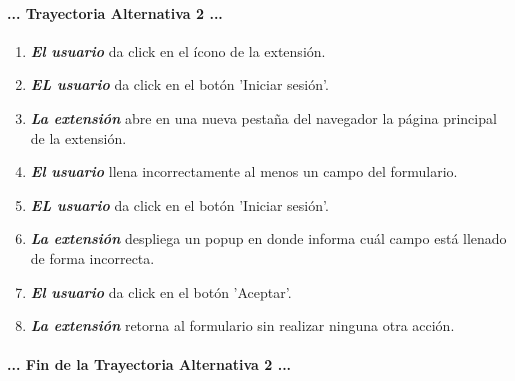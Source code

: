\documentclass[12pt, a4paper, titlepage]{report}
\begin{document}
			    \paragraph{... Trayectoria Alternativa 2 ...}
				\begin{enumerate}
					
					\item \textbf{\textit{El usuario}} da click en el ícono de la extensión.
					
					\item \textbf{\textit{EL usuario}} da click en el botón 'Iniciar sesión'.
					
					\item \textbf{\textit{La extensión}} abre en una nueva pestaña del navegador la página principal de la extensión.
					
					\item \textbf{\textit{El usuario}} llena incorrectamente al menos un campo del formulario.
					
					\item \textbf{\textit{EL usuario}} da click en el botón 'Iniciar sesión'.
					
					\item \textbf{\textit{La extensión}} despliega un popup en donde informa cuál campo está llenado de forma incorrecta.
					
					\item \textbf{\textit{El usuario}} da click en el botón 'Aceptar'.
					
					\item \textbf{\textit{La extensión}} retorna al formulario sin realizar ninguna otra acción.
					
				\end{enumerate}
				\paragraph{... Fin de la Trayectoria Alternativa 2 ...}
			    
			    
\end{document}
